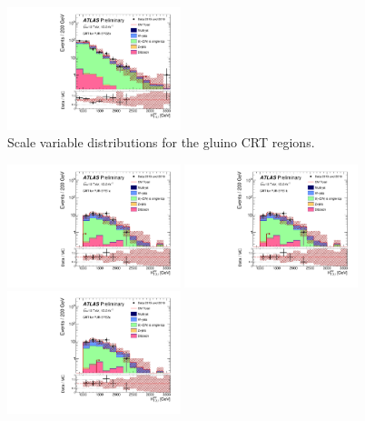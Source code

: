 \begin{figure}[tbp]
\begin{center}
\includegraphics[width=0.45\textwidth]{figures/ATLAS-CONF-2016-078_INT/N-1Plots/AtlasStyle/Preliminary/CRT_SRJigsawSRG3b_LastCut_CRT_minusone}
\end{center}
\caption{Scale variable distributions for the gluino CRT regions.}
\label{fig:CRT_SRJigsawSRG1a_LastCut_CRT_minusone}
\end{figure}

\begin{figure}[tbp]
\begin{center}
\includegraphics[width=0.45\textwidth]{figures/ATLAS-CONF-2016-078_INT/N-1Plots/AtlasStyle/Preliminary/CRT_SRJigsawSRS1a_LastCut_CRT_minusone}
\includegraphics[width=0.45\textwidth]{figures/ATLAS-CONF-2016-078_INT/N-1Plots/AtlasStyle/Preliminary/CRT_SRJigsawSRS1b_LastCut_CRT_minusone}
\includegraphics[width=0.45\textwidth]{figures/ATLAS-CONF-2016-078_INT/N-1Plots/AtlasStyle/Preliminary/CRT_SRJigsawSRS2a_LastCut_CRT_minusone}

\end{center}
\end{figure}
